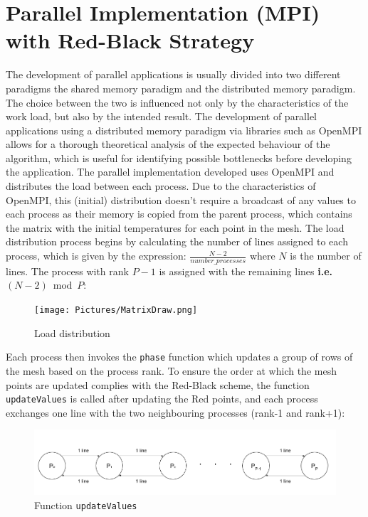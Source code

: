 \documentclass{article}
\begin{document}
\section{Parallel Implementation (MPI) with Red-Black Strategy}
The development of parallel applications is usually divided into two different paradigms the shared memory paradigm and the distributed memory paradigm.
The choice between the two is influenced not only by the characteristics of the work load, but also by the intended result. The development of 
parallel applications using a distributed memory paradigm via libraries such as OpenMPI allows for a thorough theoretical analysis of the expected
behaviour of the algorithm, which is useful for identifying possible bottlenecks before developing the application. 
The parallel implementation developed uses OpenMPI and distributes the load between each process. Due to the characteristics of OpenMPI, this (initial) 
distribution doesn't require a broadcast of any values to each process as their memory is copied from the parent process, which contains the matrix with the
initial temperatures for each point in the mesh. The load distribution process begins by calculating the number of lines assigned to each process, which 
is given by the expression: $\frac{N-2}{number\_processes}$  where $N$ is the number of lines. The process with rank $P-1$ is assigned with the remaining 
lines \textbf{i.e.} $ (N-2) \bmod P$:

\begin{figure}[H]
    \centering
    \texttt{[image: Pictures/MatrixDraw.png]}
    \caption{Load distribution}
    \label{fig:lineDiv}
\end{figure}

Each process then invokes the \texttt{phase} function which updates a group of rows of the mesh based on the process rank. To ensure the order at which
the mesh points are updated complies with the Red-Black scheme, the function \texttt{updateValues} is called after updating the Red points, and each process
exchanges one line with the two neighbouring processes (rank-1 and rank+1):

\begin{figure}[H]
    \centering
    \includegraphics[width=13cm]{Pictures/IterationCommunication.png}
    \caption{Function \texttt{updateValues}}
    \label{fig:commuLines}
\end{figure}
\end{document}
